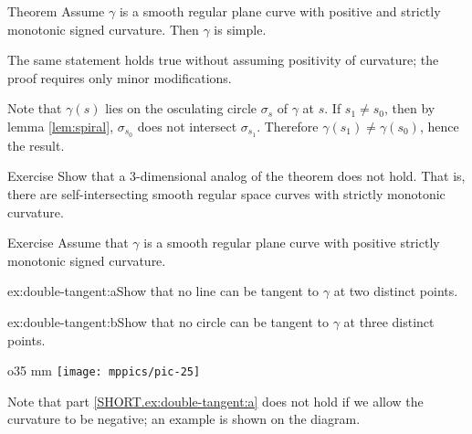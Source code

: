 \begin{thm}{Theorem}\label{thm:spiral}
Assume $\gamma$ is a smooth regular plane curve with positive and strictly monotonic signed curvature. 
Then $\gamma$ is simple.
\end{thm}

The same statement holds true without assuming positivity of curvature; the proof requires only minor modifications.

Note that $\gamma(s)$ lies on the osculating circle $\sigma_s$ of $\gamma$ at $s$.
If $s_1\ne s_0$, then by lemma \ref{lem:spiral}, $\sigma_{s_0}$ does not intersect $\sigma_{s_1}$.
Therefore $\gamma(s_1)\ne \gamma(s_0)$,
hence the result.\qeds

\begin{thm}{Exercise}\label{ex:3D-spiral}
Show that a 3-dimensional analog of the theorem does not hold.
That is, there are self-intersecting smooth regular space curves with strictly monotonic curvature.
\end{thm}

\begin{thm}{Exercise}\label{ex:double-tangent}
Assume that $\gamma$ is a smooth regular plane curve with positive strictly monotonic signed curvature.

\begin{subthm}{ex:double-tangent:a}Show that no line can be tangent to $\gamma$ at two distinct points.
\end{subthm}

\begin{subthm}{ex:double-tangent:b}Show that no circle can be tangent to $\gamma$ at three distinct points. 
\end{subthm}

\end{thm}

{

\begin{wrapfigure}{o}{35 mm}
\vskip-4mm
\centering
\texttt{[image: mppics/pic-25]}
\vskip0mm
\end{wrapfigure}

Note that part \ref{SHORT.ex:double-tangent:a} does not hold if we allow the curvature to be negative; an example is shown on the diagram.

}



